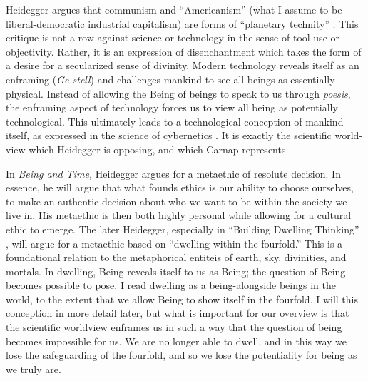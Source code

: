 \documentclass[leqno, 12pt]{turabian-researchpaper}
\begin{document}
	Heidegger argues that communism and \enquote{Americanism} (what I assume to be
	liberal-democratic industrial capitalism) are forms of \enquote{planetary technity}
	\autocite[p206]{heidegger1981}. This critique is not a row against science or technology
	in the sense of tool-use or objectivity. Rather, it is an expression of disenchantment
	which takes the form of a desire for a secularized sense of divinity. Modern
	technology reveals itself as an enframing (\textit{Ge-stell}) and challenges mankind
	to see all beings as essentially physical. Instead of allowing the Being of
	beings to speak to us through \textit{poesis}, the enframing aspect of
	technology forces us to view all being as potentially technological. This ultimately
	leads to a technological conception of mankind itself, as expressed in the
	science of cybernetics \autocite{heidegger2008c}. It is exactly the scientific
	world-view which Heidegger is opposing, and which Carnap represents.

	In \textit{Being and Time,} Heidegger argues for a metaethic of resolute
	decision. In essence, he will argue that what founds ethics is our ability to
	choose ourselves, to make an authentic decision about who we want to be within
	the society we live in. His metaethic is then both highly personal while
	allowing for a cultural ethic to emerge. The later Heidegger, especially in
	\enquote{Building Dwelling Thinking} \autocite{heidegger2008e}, will argue for
	a metaethic based on \enquote{dwelling within the fourfold.} This is a
	foundational relation to the metaphorical entiteis of earth, sky, divinities, and
	mortals. In dwelling, Being reveals itself to us as Being; the question of
	Being becomes possible to pose. I read dwelling as a being-alongside beings in
	the world, to the extent that we allow Being to show itself in the fourfold. I
	will this conception in more detail later, but what is important for our
	overview is that the scientific worldview enframes us in such a way that the
	question of being becomes impossible for us. We are no longer able to dwell,
	and in this way we lose the safeguarding of the fourfold, and so we lose the potentiality
	for being as we truly are.
\end{document}
